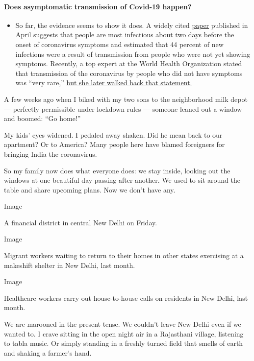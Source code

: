 \begin{itemize}
{  \paragraph{Does asymptomatic transmission of Covid-19
  happen?}\label{does-asymptomatic-transmission-of-covid-19-happen}}

  \begin{itemize}
  \tightlist
  \item
    So far, the evidence seems to show it does. A widely cited
    \href{https://www.nature.com/articles/s41591-020-0869-5}{paper}
    published in April suggests that people are most infectious about
    two days before the onset of coronavirus symptoms and estimated that
    44 percent of new infections were a result of transmission from
    people who were not yet showing symptoms. Recently, a top expert at
    the World Health Organization stated that transmission of the
    coronavirus by people who did not have symptoms was ``very rare,''
    \href{https://www.nytimes.com/2020/06/09/world/coronavirus-updates.html?action=click\&pgtype=Article\&state=default\&region=MAIN_CONTENT_3\&context=storylines_faq\#link-1f302e21}{but
    she later walked back that statement.}
  \end{itemize}
\end{itemize}

A few weeks ago when I biked with my two sons to the neighborhood milk
depot --- perfectly permissible under lockdown rules --- someone leaned
out a window and boomed: ``Go home!''

My kids' eyes widened. I pedaled away shaken. Did he mean back to our
apartment? Or to America? Many people here have blamed foreigners for
bringing India the coronavirus.

So my family now does what everyone does: we stay inside, looking out
the windows at one beautiful day passing after another. We used to sit
around the table and share upcoming plans. Now we don't have any.

Image

A financial district in central New Delhi on Friday.

Image

Migrant workers waiting to return to their homes in other states
exercising at a makeshift shelter in New Delhi, last month.

Image

Healthcare workers carry out house-to-house calls on residents in New
Delhi, last month.

We are marooned in the present tense. We couldn't leave New Delhi even
if we wanted to. I crave sitting in the open night air in a Rajasthani
village, listening to tabla music. Or simply standing in a freshly
turned field that smells of earth and shaking a farmer's hand.

